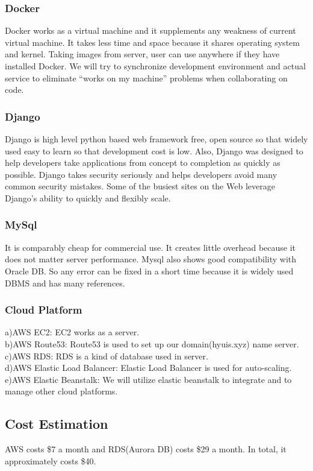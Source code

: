 \documentclass[10pt,journal,compsoc]{IEEEtran}
\begin{document}
\subsubsection{Docker}
Docker works as a virtual machine and it supplements any weakness of current virtual machine. It takes less time and space because it shares operating system and kernel. Taking images from server, user can use anywhere if they have installed Docker. We will try to synchronize development environment and actual service to eliminate “works on my machine” problems when collaborating on code.

\subsubsection{Django}
Django is high level python based web framework free, open source so that widely used easy to learn so that development cost is low. Also, Django was designed to help developers take applications from concept to completion as quickly as possible. Django takes security seriously and helps developers avoid many common security mistakes. Some of the busiest sites on the Web leverage Django’s ability to quickly and flexibly scale.

\subsubsection{MySql}
It is comparably cheap for commercial use. It creates little overhead because it does not matter server performance. Mysql also shows good compatibility with Oracle DB. So any error can be fixed in a short time because it is widely used DBMS and has many references. 

\subsubsection{Cloud Platform}
a)AWS EC2: EC2 works as a server.\\
b)AWS Route53: Route53 is used to set up our domain(hyuis.xyz) name server.\\
c)AWS RDS: RDS is a kind of database used in server.\\
d)AWS Elastic Load Balancer: Elastic Load Balancer is used for auto-scaling.\\
e)AWS Elastic Beanstalk: We will utilize elastic beanstalk to integrate and to manage other cloud platforms.\\

\subsection{Cost Estimation}
AWS costs \$7 a month and RDS(Aurora DB) costs \$29 a month. In total, it approximately costs \$40.
\end{document}
